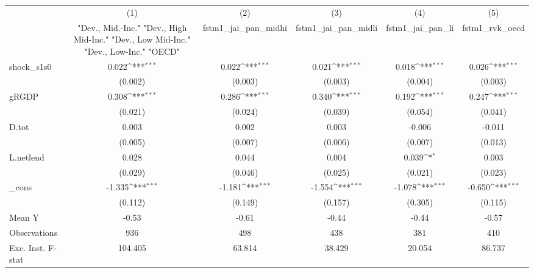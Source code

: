 {
\def\sym#1{\ifmmode^{#1}\else\(^{#1}\)\fi}
\begin{tabular}{l*{5}{c}}
\toprule
            &\multicolumn{1}{c}{(1)}&\multicolumn{1}{c}{(2)}&\multicolumn{1}{c}{(3)}&\multicolumn{1}{c}{(4)}&\multicolumn{1}{c}{(5)}\\
            &\multicolumn{1}{c}{ "Dev., Mid.-Inc." "Dev., High Mid-Inc." "Dev., Low Mid-Inc." "Dev., Low-Inc." "OECD" }&\multicolumn{1}{c}{fstm1\_jai\_pan\_midhi}&\multicolumn{1}{c}{fstm1\_jai\_pan\_midli}&\multicolumn{1}{c}{fstm1\_jai\_pan\_li}&\multicolumn{1}{c}{fstm1\_rvk\_oecd}\\
\midrule
shock\_s1s0  &       0.022\sym{***}&       0.022\sym{***}&       0.021\sym{***}&       0.018\sym{***}&       0.026\sym{***}\\
            &     (0.002)         &     (0.003)         &     (0.003)         &     (0.004)         &     (0.003)         \\
\addlinespace
gRGDP       &       0.308\sym{***}&       0.286\sym{***}&       0.340\sym{***}&       0.192\sym{***}&       0.247\sym{***}\\
            &     (0.021)         &     (0.024)         &     (0.039)         &     (0.054)         &     (0.041)         \\
\addlinespace
D.tot       &       0.003         &       0.002         &       0.003         &      -0.006         &      -0.011         \\
            &     (0.005)         &     (0.007)         &     (0.006)         &     (0.007)         &     (0.013)         \\
\addlinespace
L.netlend   &       0.028         &       0.044         &       0.004         &       0.039\sym{*}  &       0.003         \\
            &     (0.029)         &     (0.046)         &     (0.025)         &     (0.021)         &     (0.023)         \\
\addlinespace
\_cons      &      -1.335\sym{***}&      -1.181\sym{***}&      -1.554\sym{***}&      -1.078\sym{***}&      -0.650\sym{***}\\
            &     (0.112)         &     (0.149)         &     (0.157)         &     (0.305)         &     (0.115)         \\
\midrule
Mean Y      &       -0.53         &       -0.61         &       -0.44         &       -0.44         &       -0.57         \\
Observations&         936         &         498         &         438         &         381         &         410         \\
Exc. Inst. F-stat&     104.405         &      63.814         &      38.429         &      20.054         &      86.737         \\
\bottomrule
\end{tabular}
}
